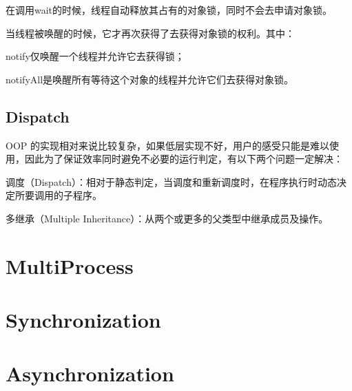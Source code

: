 \begin{compactitem}
\item  在调用wait的时候，线程自动释放其占有的对象锁，同时不会去申请对象锁。
\item 当线程被唤醒的时候，它才再次获得了去获得对象锁的权利。其中：

\begin{compactenum}
\item notify仅唤醒一个线程并允许它去获得锁；
\item notifyAll是唤醒所有等待这个对象的线程并允许它们去获得对象锁。
\end{compactenum}

\end{compactitem}





\subsection{Dispatch}



OOP 的实现相对来说比较复杂，如果低层实现不好，用户的感受只能是难以使用，因此为了保证效率同时避免不必要的运行判定，有以下两个问题一定解决：

\begin{compactitem}
\item 调度（Dispatch）：相对于静态判定，当调度和重新调度时，在程序执行时动态决定所要调用的子程序。
\item 多继承（Multiple Inheritance）：从两个或更多的父类型中继承成员及操作。
\end{compactitem}



\section{MultiProcess}



\section{Synchronization}




\section{Asynchronization}






